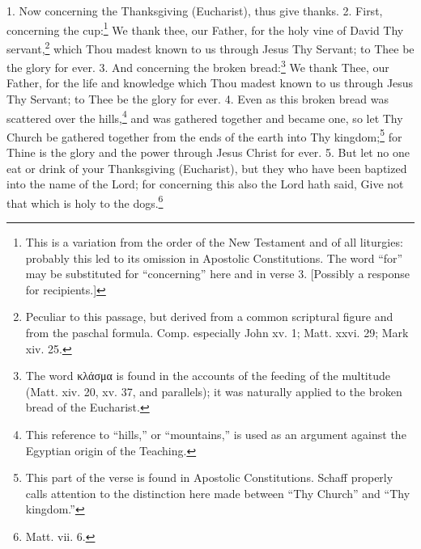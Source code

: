 1. Now concerning the Thanksgiving (Eucharist), thus give thanks. 2. First, concerning the cup:\footnote{\par  This is a variation from the order of the New Testament and of all liturgies: probably this led to its omission in Apostolic Constitutions. The word “for” may be substituted for “concerning” here and in verse 3. [Possibly a response for recipients.]} We thank thee, our Father, for the holy vine of David Thy servant,\footnote{\par  Peculiar to this passage, but derived from a common scriptural figure and from the paschal formula. Comp. especially John xv. 1; Matt. xxvi. 29; Mark xiv. 25.} which Thou madest known to us through Jesus Thy Servant; to Thee be the glory for ever. 3. And concerning the broken bread:\footnote{\par  The word \textgreek{κλάσμα} is found in the accounts of the feeding of the multitude (Matt. xiv. 20, xv. 37, and parallels); it was naturally applied to the broken bread of the Eucharist.} We thank Thee, our Father, for the life and knowledge which Thou madest known to us through Jesus Thy Servant; to Thee be the glory for ever. 4. Even as this broken bread was scattered over the hills,\footnote{\par  This reference to “hills,” or “mountains,” is used as an argument against the Egyptian origin of the Teaching.} and was gathered together and became one, so let Thy Church be gathered together from the ends of the earth into Thy kingdom;\footnote{\par  This part of the verse is found in Apostolic Constitutions. Schaff properly calls attention to the distinction here made between “Thy Church” and “Thy kingdom.”} for Thine is the glory and the power through Jesus Christ for ever. 5. But let no one eat or drink of your Thanksgiving (Eucharist), but they who have been baptized into the name of the Lord; for concerning this also the Lord hath said, Give not that which is holy to the dogs.\footnote{\par  Matt. vii. 6.}


